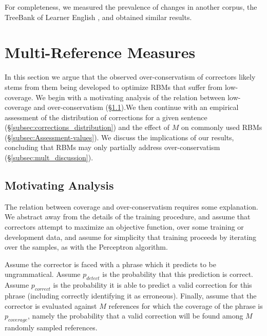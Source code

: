 \documentclass[letterpaper, 11pt]{article}
\newcommand{\oamod}[1]{{\color{red}#1}}
\begin{document}
For completeness, we measured the prevalence of changes in
another corpus, the TreeBank of Learner English \cite{yannakoudakis2011new}, and obtained similar results.
%
%
\vspace{-.1cm}
\section{Multi-Reference Measures}\label{sec:increase-reference}
%
In this section we argue that the observed over-conservatism of correctors likely stems
from them being developed to optimize RBMs that suffer from low-coverage.
We begin with a motivating analysis of the relation between low-coverage and over-conservatism (\S \ref{subsec:motivating_analysis}).We then continue with an empirical assessment of the distribution of corrections for a given sentence (\S \ref{subsec:corrections_distribution})
and the effect of $M$ on commonly used RBMs (\S \ref{subsec:Assessment-values}).
We discuss the implications of our results, concluding that RBMs may only partially address over-conservatism (\S \ref{subsec:mult_discussion}).
%
\vspace{-.2cm}
\subsection{Motivating Analysis}\label{subsec:motivating_analysis}
%
The relation between coverage and over-conservatism requires some explanation.
We abstract away from the details of the training procedure, and assume that correctors attempt to maximize an objective function, over some training or development data, \oamod{and assume for simplicity that training proceeds by iterating over the samples, as with the Perceptron algorithm.}

Assume the corrector is faced with a phrase which it predicts to be ungrammatical. Assume $p_{detect}$ is the probability that this prediction is correct.
Assume $p_{correct}$ is the probability it is able to predict
a valid correction for this phrase (including correctly identifying it as erroneous).
Finally, assume that the corrector is evaluated
against $M$ references for which the coverage of the phrase is $p_{coverage}$,
namely the probability that
a valid correction will be found among $M$ randomly sampled references.
\end{document}
